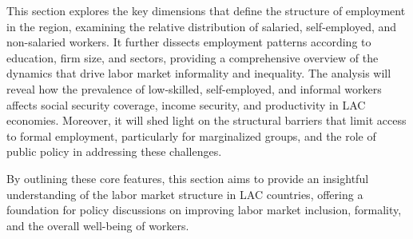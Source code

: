\documentclass[english]{article}
\begin{document}
This section explores the key dimensions that define the structure of employment in the region, examining the relative distribution of salaried, self-employed, and non-salaried workers. It further dissects employment patterns according to education, firm size, and sectors, providing a comprehensive overview of the dynamics that drive labor market informality and inequality. The analysis will reveal how the prevalence of low-skilled, self-employed, and informal workers affects social security coverage, income security, and productivity in LAC economies. Moreover, it will shed light on the structural barriers that limit access to formal employment, particularly for marginalized groups, and the role of public policy in addressing these challenges.

By outlining these core features, this section aims to provide an insightful understanding of the labor market structure in LAC countries, offering a foundation for policy discussions on improving labor market inclusion, formality, and the overall well-being of workers.
\end{document}
